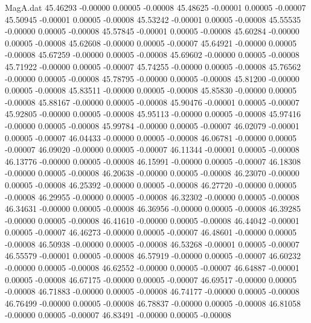 \begin{filecontents}{MagA.dat}
  45.46293   -0.00000    0.00005   -0.00008
  45.48625   -0.00001    0.00005   -0.00007
  45.50945   -0.00001    0.00005   -0.00008
  45.53242   -0.00001    0.00005   -0.00008
  45.55535   -0.00000    0.00005   -0.00008
  45.57845   -0.00001    0.00005   -0.00008
  45.60284   -0.00000    0.00005   -0.00008
  45.62608   -0.00000    0.00005   -0.00007
  45.64921   -0.00000    0.00005   -0.00008
  45.67259   -0.00000    0.00005   -0.00008
  45.69602   -0.00000    0.00005   -0.00008
  45.71922   -0.00000    0.00005   -0.00007
  45.74255   -0.00000    0.00005   -0.00008
  45.76562   -0.00000    0.00005   -0.00008
  45.78795   -0.00000    0.00005   -0.00008
  45.81200   -0.00000    0.00005   -0.00008
  45.83511   -0.00000    0.00005   -0.00008
  45.85830   -0.00000    0.00005   -0.00008
  45.88167   -0.00000    0.00005   -0.00008
  45.90476   -0.00001    0.00005   -0.00007
  45.92805   -0.00000    0.00005   -0.00008
  45.95113   -0.00000    0.00005   -0.00008
  45.97416   -0.00000    0.00005   -0.00008
  45.99784   -0.00000    0.00005   -0.00007
  46.02079   -0.00001    0.00005   -0.00007
  46.04433   -0.00000    0.00005   -0.00008
  46.06781   -0.00000    0.00005   -0.00007
  46.09020   -0.00000    0.00005   -0.00007
  46.11344   -0.00001    0.00005   -0.00008
  46.13776   -0.00000    0.00005   -0.00008
  46.15991   -0.00000    0.00005   -0.00007
  46.18308   -0.00000    0.00005   -0.00008
  46.20638   -0.00000    0.00005   -0.00008
  46.23070   -0.00000    0.00005   -0.00008
  46.25392   -0.00000    0.00005   -0.00008
  46.27720   -0.00000    0.00005   -0.00008
  46.29955   -0.00000    0.00005   -0.00008
  46.32302   -0.00000    0.00005   -0.00008
  46.34631   -0.00000    0.00005   -0.00008
  46.36956   -0.00000    0.00005   -0.00008
  46.39285   -0.00000    0.00005   -0.00008
  46.41610   -0.00000    0.00005   -0.00008
  46.44042   -0.00001    0.00005   -0.00007
  46.46273   -0.00000    0.00005   -0.00007
  46.48601   -0.00000    0.00005   -0.00008
  46.50938   -0.00000    0.00005   -0.00008
  46.53268   -0.00001    0.00005   -0.00007
  46.55579   -0.00001    0.00005   -0.00008
  46.57919   -0.00000    0.00005   -0.00007
  46.60232   -0.00000    0.00005   -0.00008
  46.62552   -0.00000    0.00005   -0.00007
  46.64887   -0.00001    0.00005   -0.00008
  46.67175   -0.00000    0.00005   -0.00007
  46.69517   -0.00000    0.00005   -0.00008
  46.71883   -0.00000    0.00005   -0.00008
  46.74177   -0.00000    0.00005   -0.00008
  46.76499   -0.00000    0.00005   -0.00008
  46.78837   -0.00000    0.00005   -0.00008
  46.81058   -0.00000    0.00005   -0.00007
  46.83491   -0.00000    0.00005   -0.00008

\end{filecontents}
